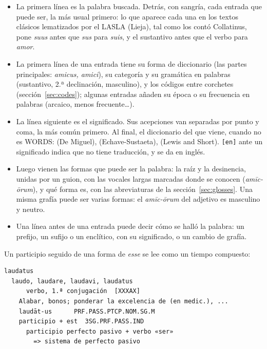 \documentclass[12pt,
              article,
              oneside
              ]{memoir}
\begin{document}
%
\begin{itemize}
\item La primera línea es la palabra buscada. Detrás, con sangría, cada
  entrada que puede ser, la más usual primero: lo que aparece cada una
  en los textos clásicos lematizados por el LASLA (Lieja), tal como los
  contó Collatinus, pone \textit{suus} antes que \textit{sus} para
  \textit{suis}, y el sustantivo antes que el verbo para
  \textit{amor}.
\item La primera línea de una entrada tiene su forma de diccionario (las
  partes principales: \textit{amicus, amici}), su categoría y su gramática
  en palabras (sustantivo, 2.ª declinación, masculino), y los códigos
  entre corchetes (sección~\ref{sec:codes}); algunas entradas añaden su
  época o su frecuencia en palabras (arcaico, menos frecuente\ldots).
\item La línea siguiente es el significado. Sus acepciones van separadas
  por punto y coma, la más común primero. Al final, el diccionario del que
  viene, cuando no es WORDS: (De Miguel), (Echave-Sustaeta), (Lewis and
  Short). \texttt{[en]} ante un significado indica que no tiene
  traducción, y se da en inglés.
\item Luego vienen las formas que puede ser la palabra: la raíz y la
  desinencia, unidas por un guion, con las vocales largas marcadas donde
  se conocen (\textit{amīc-ōrum}), y qué forma es, con las abreviaturas de
  la sección~\ref{sec:glosses}. Una misma grafía puede ser varias formas:
  el \textit{amīc-ōrum} del adjetivo es masculino y neutro.
\item Una línea antes de una entrada puede decir cómo se halló la palabra:
  un prefijo, un sufijo o un enclítico, con su significado, o un cambio de
  grafía.
\end{itemize}

\noindent{}%
Un participio seguido de una forma de \textit{esse} se lee como un tiempo
compuesto:

\begin{verbatim}
laudatus
  laudo, laudare, laudavi, laudatus
      verbo, 1.ª conjugación  [XXXAX]
    Alabar, bonos; ponderar la excelencia de (en medic.), ...
    laudāt-us      PRF.PASS.PTCP.NOM.SG.M
    participio + est  3SG.PRF.PASS.IND
      participio perfecto pasivo + verbo «ser»
        => sistema de perfecto pasivo
\end{verbatim}
\end{document}
